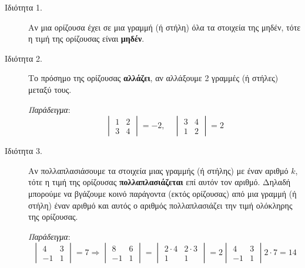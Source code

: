



\geometry{top=2cm}
\pagestyle{vangelis}




\begin{center}
  \minibox{\large\bfseries \textcolor{Col1}{Ιδιότητες των Οριζουσών}}
\end{center}

\vspace{\baselineskip}

\begin{description}

  \item[Ιδιότητα 1.] Αν μια ορίζουσα έχει σε μια γραμμή (ή στήλη) όλα τα στοιχεία της 
    μηδέν, τότε η τιμή της ορίζουσας είναι \textbf{μηδέν}.

  \item[Ιδιότητα 2.] Το πρόσημο της ορίζουσας \textbf{αλλάζει}, αν αλλάξουμε 2 
    γραμμές (ή στήλες) μεταξύ τους.

    \textit{Παράδειγμα}: 
    \[
      \begin{vmatrix}
        1 & 2 \\
        3 & 4 
      \end{vmatrix}
      = -2, \quad 
      \begin{vmatrix}
        3 & 4 \\
        1 & 2 
      \end{vmatrix}=2
    \]

  \item[Ιδιότητα 3.] Αν πολλαπλασιάσουμε τα στοιχεία μιας γραμμής (ή στήλης) με έναν
    αριθμό $k$, τότε η τιμή της ορίζουσας \textbf{πολλαπλασιάζεται} επί αυτόν τον 
    αριθμό. Δηλαδή μπορούμε να βγάζουμε κοινό παράγοντα (εκτός ορίζουσας) από μια 
    γραμμή (ή στήλη) έναν αριθμό και αυτός ο αριθμός πολλαπλασιάζει την τιμή ολόκληρης 
    της ορίζουσας.

    \textit{Παράδειγμα}:
    \[
      \begin{vmatrix}
        4 & 3 \\
        -1 & 1
      \end{vmatrix}=7 \Rightarrow 
      \begin{vmatrix}
        8 & 6 \\
        -1 & 1 
      \end{vmatrix} =
      \begin{vmatrix}
        2\cdot 4 & 2\cdot 3 \\
        1 & 1 
        \end{vmatrix}=2 \begin{vmatrix}
        4 & 3 \\
        -1 & 1 
      \end{vmatrix}2\cdot 7 = 14
    \]



\end{description}
